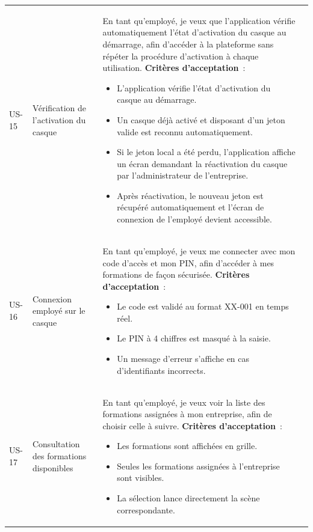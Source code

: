 \begin{longtable}{lp{2.8cm}p{8cm}l}
  US-15 & Vérification de l'activation du casque &
  En tant qu'employé, je veux que l'application vérifie automatiquement
  l'état d'activation du casque au démarrage, afin d'accéder à la
  plateforme sans répéter la procédure d'activation à chaque utilisation.
  \newline\textbf{Critères d'acceptation}~:
  \begin{itemize}
    \item L'application vérifie l'état d'activation du casque au démarrage.
    \item Un casque déjà activé et disposant d'un jeton valide est reconnu automatiquement.
    \item Si le jeton local a été perdu, l'application affiche un écran demandant
      la réactivation du casque par l'administrateur de l'entreprise.
    \item Après réactivation, le nouveau jeton est récupéré automatiquement
      et l'écran de connexion de l'employé devient accessible.
  \end{itemize}
  & \must{} \\[4pt]

  US-16 & Connexion employé sur le casque &
    En tant qu'employé, je veux me connecter avec mon code d'accès et
    mon PIN, afin d'accéder à mes formations de façon sécurisée.
    \newline\textbf{Critères d'acceptation}~:
    \begin{itemize}
      \item Le code est validé au format XX-001 en temps réel.
      \item Le PIN à 4 chiffres est masqué à la saisie.
      \item Un message d'erreur s'affiche en cas d'identifiants incorrects.
    \end{itemize}
    & \must{} \\[4pt]

  US-17 & Consultation des formations disponibles &
    En tant qu'employé, je veux voir la liste des formations assignées
    à mon entreprise, afin de choisir celle à suivre.
    \newline\textbf{Critères d'acceptation}~:
    \begin{itemize}
      \item Les formations sont affichées en grille.
      \item Seules les formations assignées à l'entreprise sont visibles.
      \item La sélection lance directement la scène correspondante.
    \end{itemize}
    & \must{} \\[4pt]


\end{longtable}
